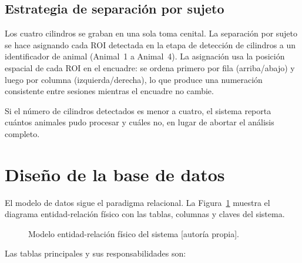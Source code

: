 \subsection{Estrategia de separación por sujeto}

Los cuatro cilindros se graban en una sola toma cenital. La separación por sujeto
se hace asignando cada ROI detectada en la etapa de detección de cilindros a un
identificador de animal (Animal~1 a Animal~4). La asignación usa la posición
espacial de cada ROI en el encuadre: se ordena primero por fila (arriba/abajo) y
luego por columna (izquierda/derecha), lo que produce una numeración consistente
entre sesiones mientras el encuadre no cambie.

Si el número de cilindros detectados es menor a cuatro, el sistema reporta cuántos
animales pudo procesar y cuáles no, en lugar de abortar el análisis completo.

\section{Diseño de la base de datos}

El modelo de datos sigue el paradigma relacional. La Figura~\ref{fig:er} muestra el
diagrama entidad-relación físico con las tablas, columnas y claves del sistema.

\begin{figure}[ht]
\centering
\caption{Modelo entidad-relación físico del sistema [autoría propia].}
\label{fig:er}
\end{figure}

Las tablas principales y sus responsabilidades son:

